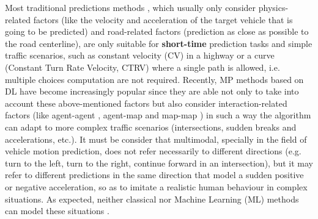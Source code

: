 Most traditional predictions methods \cite{huang2022survey}, which usually only consider physics-related factors (like the velocity and acceleration of the target vehicle that is going to be predicted) and road-related factors (prediction as close as possible to the road centerline), are only suitable for \textbf{short-time} prediction tasks \cite{huang2022survey} and simple traffic scenarios, such as constant velocity (CV) in a highway or a curve (Constant Turn Rate Velocity, CTRV) where a single path is allowed, i.e. multiple choices computation are not required. Recently, MP methods based on DL have become increasingly popular since they are able not only to take into account these above-mentioned factors but also consider interaction-related factors (like agent-agent \cite{gupta2018social}, agent-map \cite{casas2018intentnet} and map-map \cite{liang2020learning}) in such a way the algorithm can adapt to more complex traffic scenarios (intersections, sudden breaks and accelerations, etc.). It must be consider that multimodal, specially in the field of vehicle motion prediction, does not refer necessarily to different directions (e.g. turn to the left, turn to the right, continue forward in an intersection), but it may refer to different predictions in the same direction that model a sudden positive or negative acceleration, so as to imitate a realistic human behaviour in complex situations. As expected, neither classical nor Machine Learning (ML) methods can model these situations \cite{huang2022survey}.

